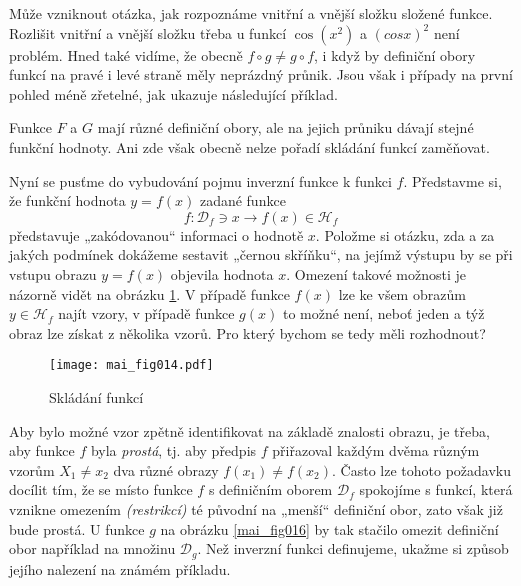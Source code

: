       Může vzniknout otázka, jak rozpoznáme vnitřní a vnější složku složené funkce. Rozlišit 
      vnitřní a vnější složku třeba u funkcí \(\cos(x^2)\) a \((cos x)^2\) není problém. Hned také 
      vidíme, že obecně \(f\circ g\neq g\circ f\), i když by definiční obory funkcí na pravé i levé 
      straně měly neprázdný průnik. Jsou však i případy na první pohled méně zřetelné, jak ukazuje 
      následující příklad.
      
        
       
      Funkce \(F\) a \(G\) mají různé definiční obory, ale na jejich průniku dávají stejné funkční 
      hodnoty. Ani zde však obecně nelze pořadí skládání funkcí zaměňovat.
      
      Nyní se pusťme do vybudování pojmu inverzní funkce k funkci \(f\). Představme si, že funkční
      hodnota \(y = f(x)\) zadané funkce
      \begin{equation*}
        f: \mathcal{D}_f\ni x \rightarrow f(x)\in\mathcal{H}_f
      \end{equation*}
      představuje „zakódovanou“ informaci o hodnotě \(x\). Položme si otázku, zda a za jakých 
      podmínek dokážeme sestavit „černou skříňku“, na jejímž výstupu by se při vstupu obrazu \(y = 
      f(x)\) objevila hodnota \(x\). Omezení takové možnosti je názorně vidět na obrázku 
      \ref{mai_fig014}. V případě funkce \(f(x)\) lze ke všem obrazům \(y \in \mathcal{H}_f\) najít 
      vzory, v případě funkce \(g(x)\) to možné není, neboť jeden a týž obraz lze získat z několika 
      vzorů. Pro který bychom se tedy měli rozhodnout?
      
      \begin{figure}[ht!] %
        \centering
%        
        \texttt{[image: mai\_fig014.pdf]}
        \caption{Skládání funkcí \cite[s.~61]{Musilova2009MA1}}
        \label{mai_fig014}
      \end{figure}
       Aby bylo možné vzor zpětně identifikovat na základě znalosti obrazu, je třeba, aby funkce 
       \(f\) byla \emph{prostá}, tj. aby předpis \(f\) přiřazoval každým dvěma různým vzorům \(X_1 
       \neq x_2\) dva různé obrazy \(f(x_1) \neq f(x_2)\). Často lze tohoto požadavku docílit tím, 
       že se místo funkce \(f\) s definičním oborem \(\mathcal{D}_f\) spokojíme s funkcí, která 
       vznikne omezením \emph{(restrikcí)} té původní na „menší“ definiční obor, zato však již bude 
       prostá. U funkce \(g\) na obrázku \ref{mai_fig016} by tak stačilo omezit definiční obor 
       například na množinu \(\mathcal{D}_g\). Než inverzní funkci definujeme, ukažme si způsob 
       jejího nalezení na známém příkladu.

